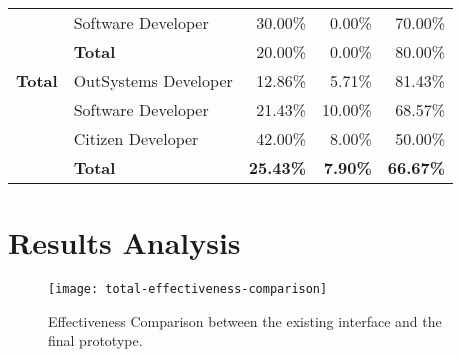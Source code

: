 \begin{table}[tb]
\begin{tabular}{llrrr}
                            & Software Developer   & 30.00\%                                                           & 0.00\%                                                                  & 70.00\%                                                       \\
                            & \textbf{Total}       & 20.00\%                                                           & 0.00\%                                                                  & 80.00\%                                                       \\ \hline
  \rowcolor[HTML]{EFEFEF} 
  \textbf{Total}            & OutSystems Developer & 12.86\%                                                           & 5.71\%                                                                  & 81.43\%                                                       \\
  \rowcolor[HTML]{EFEFEF} 
                            & Software Developer   & 21.43\%                                                           & 10.00\%                                                                 & 68.57\%                                                       \\
  \rowcolor[HTML]{EFEFEF} 
                            & Citizen Developer    & 42.00\%                                                           & 8.00\%                                                                  & 50.00\%                                                       \\
  \rowcolor[HTML]{EFEFEF} 
                            & \textbf{Total}       & \textbf{25.43\%}                                                  & \textbf{7.90\%}                                                         & \textbf{66.67\%}                                              \\ \hline
  \end{tabular}
  \end{table}

\section{Results Analysis}
\label{sec:results_analysis}

\begin{figure}[htbp]
	\centering
	\texttt{[image: total-effectiveness-comparison]}
	\caption{Effectiveness Comparison between the existing interface and the final prototype.}
	\label{fig:totalEffectivenessComparison}
\end{figure}

